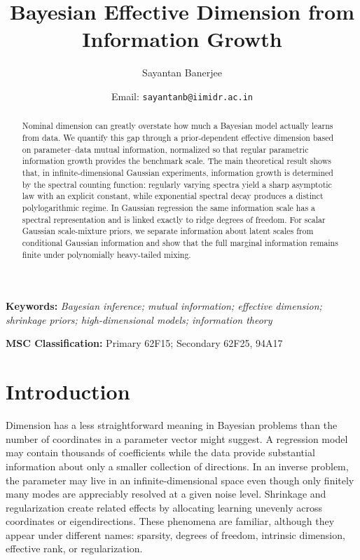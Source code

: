 \documentclass[11pt]{article}
\title{Bayesian Effective Dimension from Information Growth}
\author{Sayantan Banerjee \orcidlink{0000-0001-5414-4817}}
\affil{Operations Management \& Quantitative Techniques Area\\Indian Institute of Management Indore \\ Rau-Pithampur Road, Indore MP 453 556
}
\date{Email: \texttt{sayantanb@iimidr.ac.in}}
\theoremstyle{plain}
\theoremstyle{definition}
\theoremstyle{remark}
\begin{document}
	\maketitle
	
\begin{abstract}
	Nominal dimension can greatly overstate how much a Bayesian model actually learns from data. We quantify this gap through a prior-dependent effective dimension based on parameter--data mutual information, normalized so that regular parametric information growth provides the benchmark scale. The main theoretical result shows that, in infinite-dimensional Gaussian experiments, information growth is determined by the spectral counting function: regularly varying spectra yield a sharp asymptotic law with an explicit constant, while exponential spectral decay produces a distinct polylogarithmic regime. In Gaussian regression the same information scale has a spectral representation and is linked exactly to ridge degrees of freedom. For scalar Gaussian scale-mixture priors, we separate information about latent scales from conditional Gaussian information and show that the full marginal information remains finite under polynomially heavy-tailed mixing.
\end{abstract}


	
	\textbf{Keywords:}\emph{
		Bayesian inference;
		mutual information;
		effective dimension;
		shrinkage priors;
		high-dimensional models;
		information theory
	}
	
	\textbf{MSC Classification:} Primary 62F15; Secondary 62F25, 94A17
	
	\sloppy

\section{Introduction}
\label{sec:introduction}

Dimension has a less straightforward meaning in Bayesian problems than the number of coordinates in a parameter vector might suggest. A regression model may contain thousands of coefficients while the data provide substantial information about only a smaller collection of directions. In an inverse problem, the parameter may live in an infinite-dimensional space even though only finitely many modes are appreciably resolved at a given noise level. Shrinkage and regularization create related effects by allocating learning unevenly across coordinates or eigendirections. These phenomena are familiar, although they appear under different names: sparsity, degrees of freedom, intrinsic dimension, effective rank, or regularization.
\end{document}
